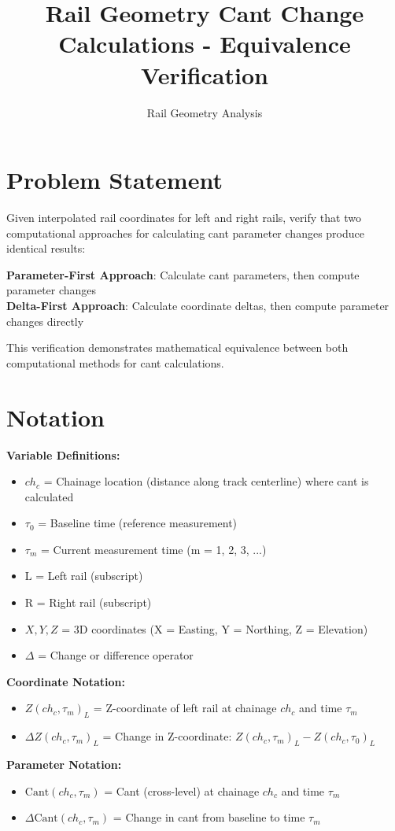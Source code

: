 \documentclass{article}
\title{Rail Geometry Cant Change Calculations - Equivalence Verification}
\author{Rail Geometry Analysis}
\date{}
\begin{document}
\maketitle

\section{Problem Statement}
Given interpolated rail coordinates for left and right rails, verify that two computational approaches for calculating cant parameter changes produce identical results:

\textbf{Parameter-First Approach}: Calculate cant parameters, then compute parameter changes\\
\textbf{Delta-First Approach}: Calculate coordinate deltas, then compute parameter changes directly

This verification demonstrates mathematical equivalence between both computational methods for cant calculations.

\section{Notation}
\textbf{Variable Definitions:}
\begin{itemize}
\item $ch_c$ = Chainage location (distance along track centerline) where cant is calculated
\item $\tau_0$ = Baseline time (reference measurement)
\item $\tau_m$ = Current measurement time (m = 1, 2, 3, ...)
\item $\text{L}$ = Left rail (subscript)
\item $\text{R}$ = Right rail (subscript)
\item $X, Y, Z$ = 3D coordinates (X = Easting, Y = Northing, Z = Elevation)
\item $\Delta$ = Change or difference operator
\end{itemize}

\textbf{Coordinate Notation:}
\begin{itemize}
\item $Z(ch_c, \tau_m)_L$ = Z-coordinate of left rail at chainage $ch_c$ and time $\tau_m$
\item $\Delta Z(ch_c, \tau_m)_L$ = Change in Z-coordinate: $Z(ch_c, \tau_m)_L - Z(ch_c, \tau_0)_L$
\end{itemize}

\textbf{Parameter Notation:}
\begin{itemize}
\item $\text{Cant}(ch_c, \tau_m)$ = Cant (cross-level) at chainage $ch_c$ and time $\tau_m$
\item $\Delta\text{Cant}(ch_c, \tau_m)$ = Change in cant from baseline to time $\tau_m$
\end{itemize}
\end{document}
